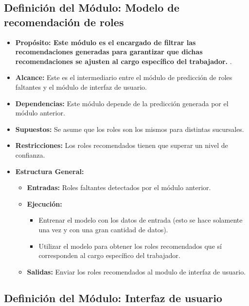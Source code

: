 \documentclass[11pt,letterpaper]{article}
\begin{document}
\subsection{Definición del Módulo: Modelo de recomendación de roles}

\begin{itemize}

\item \textbf{Propósito: Este módulo es el encargado de filtrar las recomendaciones generadas para garantizar que dichas recomendaciones se ajusten al cargo específico del trabajador.} .

\item \textbf{Alcance:} Este es el intermediario entre el módulo de predicción de roles faltantes y el módulo de interfaz de usuario.

\item \textbf{Dependencias:} Este módulo depende de la predicción generada por el módulo anterior.

\item \textbf{Supuestos:} Se asume que los roles son los mismos para distintas sucursales.

    


\item \textbf{Restricciones:} 
Los roles recomendados tienen que superar un nivel de confianza.
\item \textbf{Estructura General:}
\begin{itemize}
    \item \textbf{Entradas:} Roles faltantes detectados por el módulo anterior.
    \item \textbf{Ejecución:}
    \begin{itemize}
        \item Entrenar el modelo con los datos de entrada (esto se hace solamente una vez y con una gran cantidad de datos).
        \item Utilizar el modelo para obtener los roles recomendados que sí corresponden al cargo específico del trabajador.
    \end{itemize}
    \item \textbf{Salidas: }Enviar los roles recomendados al modulo de interfaz de usuario.
\end{itemize}
\end{itemize}



\subsection{Definición del Módulo: Interfaz de usuario}
\end{document}

